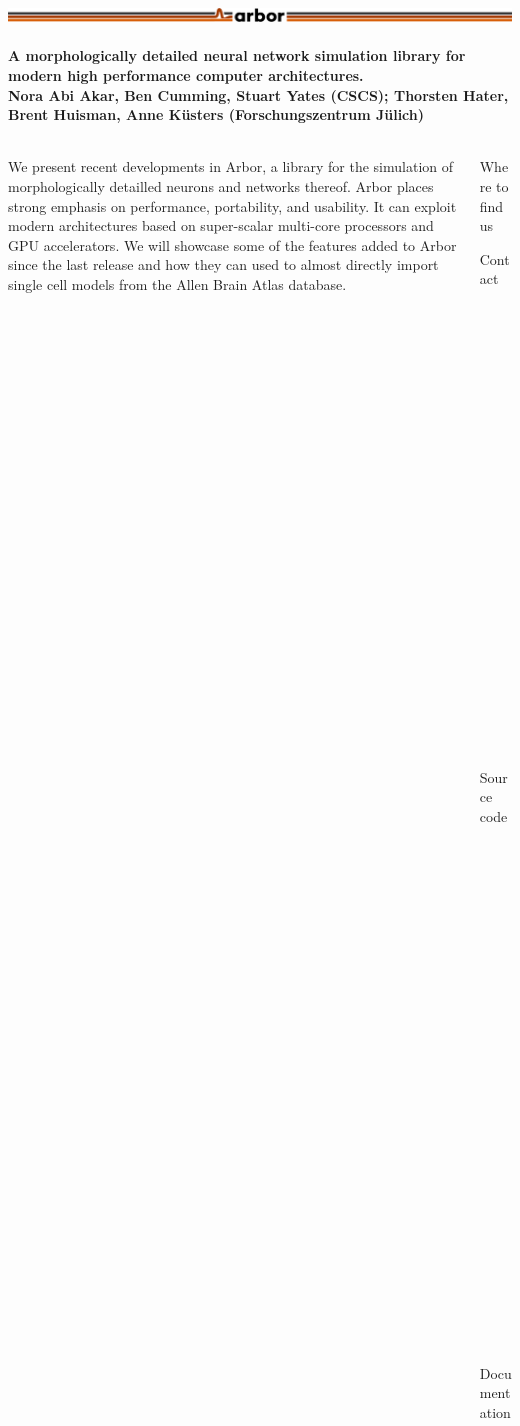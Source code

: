 \documentclass{beamer}
\begin{document}
\begin{frame}[t, fragile]
  \frametitle{\includegraphics[width=\linewidth]{img/arbor-lines-proto-colour-full}}
  \framesubtitle{A morphologically detailed neural network simulation library for modern high performance computer architectures.\\
    \tiny{Nora Abi Akar, Ben Cumming, Stuart Yates (CSCS); Thorsten Hater, Brent Huisman, Anne Küsters (Forschungszentrum Jülich)}}

  \begin{columns}
    \begin{column}{0.65\textwidth}
      We present recent developments in Arbor, a library for the simulation of
      morphologically detailled neurons and networks thereof. Arbor places strong
      emphasis on performance, portability, and usability. It can exploit modern
      architectures based on super-scalar multi-core processors and GPU accelerators.
      We will showcase some of the features added to Arbor since the last release and
      how they can used to almost directly import single cell models from the Allen
      Brain Atlas database.
    \end{column}
    \begin{column}{0.3\textwidth}
      \begin{block}{Where to find us}
        \begin{description}
          \item[Contact] arbor-sim@fz-juelich.de
          \item[Source code] github.com/arbor-sim/arbor
          \item[Documentation] arbor.readthedocs.io
        \end{description}
      \end{block}
    \end{column}
  \end{columns}


\end{frame}
\end{document}

